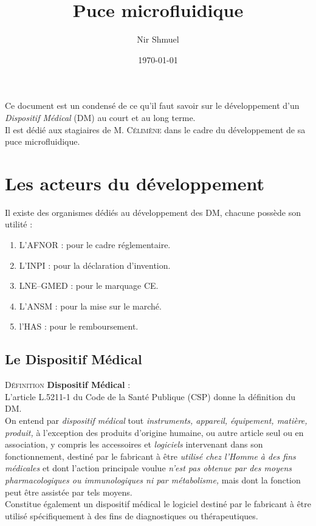 \documentclass[a4paper,11pt]{article}
\title{\Huge \bf \sc Puce microfluidique}
\author{\fontfamily{pzc} \selectfont \LARGE Nir Shmuel}
\date{\today}
\newcounter{defi}
\newcommand{\defi}[1]{\addtocounter{defi}{1}%
  \noindent\textsc{Définition \thedefi } \textbf{#1} :\\ }
\begin{document}
\pagestyle{fancy}
\chead{}

\maketitle

Ce document est un condensé de ce qu'il faut savoir sur le développement d'un \emph{Dispositif Médical} (DM) au court et au long terme.\\
Il est dédié aux stagiaires de M. \textsc{Célimène} dans le cadre du développement de sa puce microfluidique. 
  \begin{sloppypar}

\renewcommand{\thepage}{\arabic{page}}
\setcounter{page}{0}
\tableofcontents
\thispagestyle{empty}

\newpage

\section{Les acteurs du développement}
Il existe des organismes dédiés au développement des DM, chacune possède son utilité :
\begin{enumerate}
 \item L'AFNOR : pour le cadre réglementaire.
 \item L'INPI : pour la déclaration d'invention.
 \item LNE--GMED : pour le marquage CE.
 \item L'ANSM : pour la mise sur le marché.
 \item l'HAS : pour le remboursement.
\end{enumerate}

\subsection{Le Dispositif Médical}
\defi{Dispositif Médical}
L'article L.5211-1 du Code de la Santé Publique (CSP) donne la définition du DM.\\
\og On entend par \emph{dispositif médical} tout \emph{instruments, appareil, équipement, matière, produit,} à l'exception des produits d'origine humaine, ou autre
article seul ou en association, y compris les accessoires et \emph{logiciels} intervenant dans son fonctionnement, destiné par le fabricant à être \emph{utilisé 
  chez l'Homme à des fins médicales} et dont l'action principale voulue \emph{n'est pas obtenue par des moyens pharmacologiques ou immunologiques ni par métabolisme,}
mais dont la fonction peut être assistée par tels moyens.\\
Constitue également un dispositif médical le logiciel destiné par le fabricant à être utilisé spécifiquement à des fins de diagnostiques ou thérapeutiques.\fg


\end{sloppypar}
\end{document}
